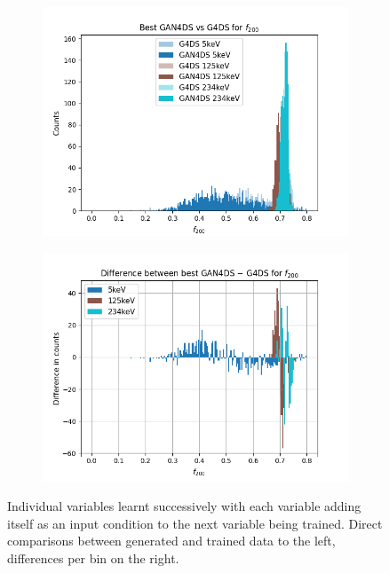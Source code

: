 \documentclass[11pt]{article} %
\begin{document}
\begin{figure}[H]
\begin{minipage}{\textwidth}
\begin{subfigure}{.5\textwidth}
      \includegraphics[scale=0.6]{./images/best_f200like.png}
  \end{subfigure}
  \begin{subfigure}{.5\textwidth}
      \includegraphics[scale=0.6]{./images/difference_best_f200like.png}
  \end{subfigure}
\end{minipage}
\caption{Individual variables learnt successively with each variable adding itself as an input condition
to the next variable being trained. Direct comparisons between generated and trained data to the left, differences per bin on the right.}
\label{fig:ind_results}
\end{figure}
\end{document}
